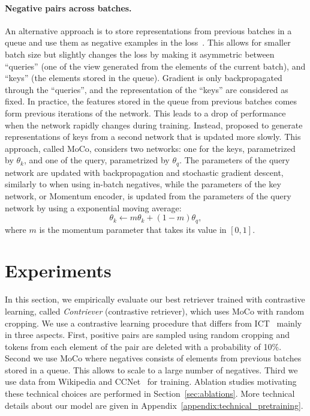 \documentclass[10pt]{article} %
\begin{document}
\paragraph{Negative pairs across batches.}
An alternative approach is to store representations from previous batches in a queue and use them as negative examples in the loss~\citep{wu2018unsupervised}.
This allows for smaller batch size but slightly changes the loss by making it asymmetric between ``queries'' (one of the view generated from the elements of the current batch), and ``keys'' (the elements stored in the queue).
Gradient is only backpropagated through the ``queries'', and the representation of the ``keys'' are considered as fixed. 
In practice, the features stored in the queue from previous batches comes form previous iterations of the network.
This leads to a drop of performance when the network rapidly changes during training.
Instead, \citet{he2020momentum} proposed to generate representations of keys from a second network that is updated more slowly.
This approach, called MoCo, considers two networks: one for the keys, parametrized by $\theta_k$,  and one of the query, parametrized by $\theta_q$. 
The parameters of the query network are updated with backpropagation and stochastic gradient descent, similarly to when using in-batch negatives, while the parameters of the key network, or Momentum encoder, is updated from the parameters of the query network by using a exponential moving average:
\begin{equation}
\theta_k \leftarrow m \theta_k + (1 - m) \theta_q,
\end{equation}
where $m$ is the momentum parameter that takes its value in $[0, 1]$.

\section{Experiments}
In this section, we empirically evaluate our best retriever trained with contrastive learning, called \emph{Contriever} (contrastive retriever), which uses MoCo with random cropping.
We use a contrastive learning procedure that differs from ICT~\citep{lee2019latent} mainly in three aspects.
First, positive pairs are sampled using random cropping and tokens from each element of the pair are deleted with a probability of 10\%.
Second we use MoCo where negatives consists of elements from previous batches stored in a queue. 
This allows to scale to a large number of negatives.
Third we use data from Wikipedia and CCNet~\citep{wenzek-etal-2020-ccnet} for training.
Ablation studies motivating these technical choices are performed in Section~\ref{sec:ablations}.
More technical details about our model are given in Appendix~\ref{appendix:technical_pretraining}.
\end{document}
